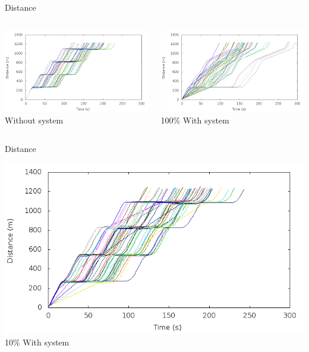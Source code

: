 \begin{frame}{Distance}
\begin{columns}
	\begin{column}{0.5\textwidth}
	\includegraphics[width=1\textwidth]{images/tp0/distance0.png}\\
	Without system
	\end{column}
	\begin{column}{0.5\textwidth}
	\includegraphics[width=1\textwidth]{images/tp0/distance100.png}\\
	100\% With system
	\end{column}
\end{columns}
\end{frame}


\begin{frame}{Distance}

\includegraphics[width=1\textwidth]{images/tp0/distance10.png}\\
10\% With system
\end{frame}


